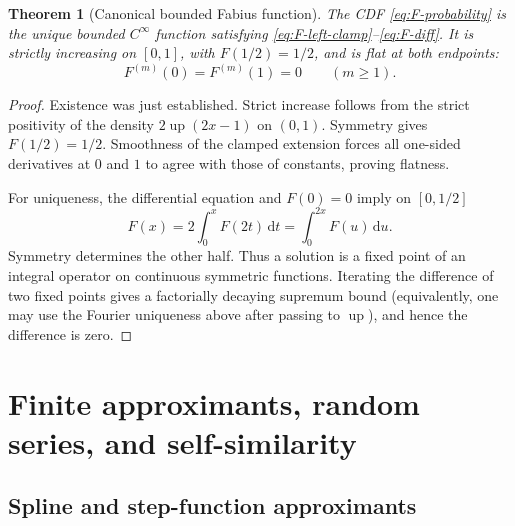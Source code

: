\documentclass[11pt]{article}
\numberwithin{equation}{section}
\newtheorem{theorem}{Theorem}[section]
\theoremstyle{definition}
\theoremstyle{remark}
\newcommand{\upf}{\operatorname{up}}
\newcommand{\dd}{\,\mathrm d}
\begin{document}
\begin{theorem}[Canonical bounded Fabius function]\label{thm:bounded-existence}
The CDF \eqref{eq:F-probability} is the unique bounded $C^\infty$ function satisfying \eqref{eq:F-left-clamp}--\eqref{eq:F-diff}.  It is strictly increasing on $[0,1]$, with $F(1/2)=1/2$, and is flat at both endpoints:
\begin{equation}\label{eq:F-flat}
 F^{(m)}(0)=F^{(m)}(1)=0\qquad(m\ge1).
\end{equation}
\end{theorem}

\begin{proof}
Existence was just established.  Strict increase follows from the strict positivity of the density $2\upf(2x-1)$ on $(0,1)$.  Symmetry gives $F(1/2)=1/2$.  Smoothness of the clamped extension forces all one-sided derivatives at $0$ and $1$ to agree with those of constants, proving flatness.

For uniqueness, the differential equation and $F(0)=0$ imply on $[0,1/2]$
\[
 F(x)=2\int_0^xF(2t)\dd t=\int_0^{2x}F(u)\dd u.
\]
Symmetry determines the other half.  Thus a solution is a fixed point of an integral operator on continuous symmetric functions.  Iterating the difference of two fixed points gives a factorially decaying supremum bound (equivalently, one may use the Fourier uniqueness above after passing to $\upf$), and hence the difference is zero.
\end{proof}


\section{Finite approximants, random series, and self-similarity}

\subsection{Spline and step-function approximants}
\end{document}
